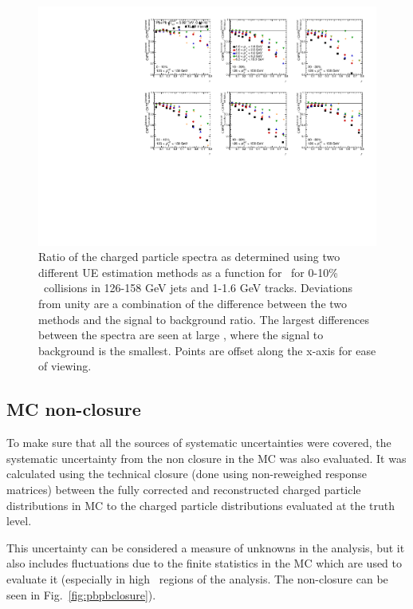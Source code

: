 \begin{figure}
\centerline{\includegraphics[page=2,width=1.\textwidth]{figures/main/systematics/ChPS_UE_Comparison}}
    \caption{Ratio of the charged particle spectra as determined using two different UE estimation methods as a function for \rvar\ for 0-10\% \pbpb\ collisions in 126-158 GeV jets and 1-1.6 GeV tracks.
Deviations from unity are a combination of the difference between the two methods and the signal to background ratio.
 The largest differences between the spectra are seen at large \rvar, where the signal to background is the smallest.
Points are offset along the x-axis for ease of viewing.}
    \label{fig:conemethod_chps_comparison}
\end{figure}

\subsection{MC non-closure}
To make sure that all the sources of systematic uncertainties were covered, the systematic uncertainty from the non closure in the MC was also evaluated.
It was 
calculated using the technical closure (done using non-reweighed response matrices) between the fully corrected and reconstructed charged particle distributions in MC to the charged particle distributions
evaluated at the truth level.

This uncertainty can be considered a measure of unknowns in the analysis, but it also includes fluctuations due to 
the finite statistics in the MC which are used to evaluate it (especially in high \pttrk\ regions of
the analysis.
The non-closure can be seen in Fig.~\ref{fig:pbpbclosure}).
 
